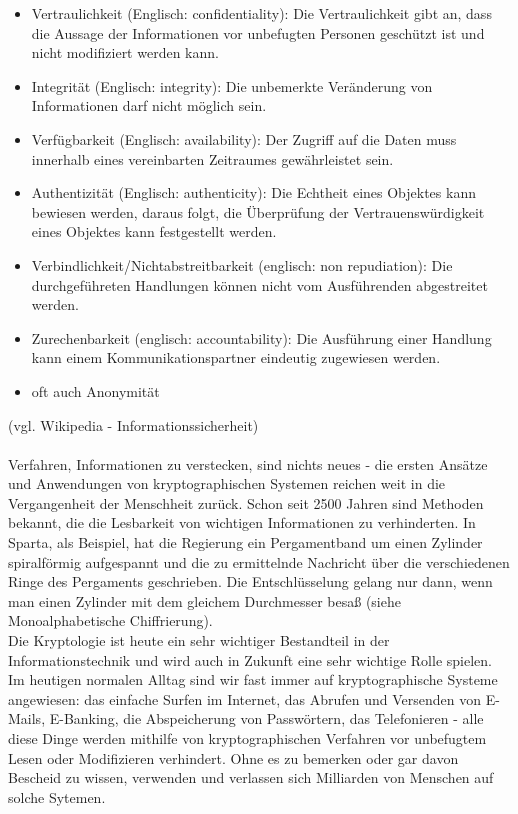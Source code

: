 \documentclass[12pt,a4paper]{report}
\begin{document}
\begin{itemize}
\item Vertraulichkeit (Englisch: confidentiality): Die Vertraulichkeit gibt an, dass die Aussage der Informationen vor unbefugten Personen geschützt ist und nicht modifiziert werden kann.
\item Integrität (Englisch: integrity): Die unbemerkte Veränderung von Informationen darf nicht möglich sein.
\item Verfügbarkeit (Englisch: availability): Der Zugriff auf die Daten muss innerhalb eines vereinbarten Zeitraumes gewährleistet sein.
\item Authentizität (Englisch: authenticity): Die Echtheit eines Objektes kann bewiesen werden, daraus folgt, die Überprüfung der Vertrauenswürdigkeit eines Objektes kann festgestellt werden.
\item Verbindlichkeit/Nichtabstreitbarkeit (englisch: non repudiation): Die durchgeführeten Handlungen können nicht vom Ausführenden abgestreitet werden.
\item Zurechenbarkeit (englisch: accountability): Die Ausführung einer Handlung kann einem Kommunikationspartner eindeutig zugewiesen werden.
\item oft auch Anonymität
\end{itemize}

(vgl. Wikipedia - Informationssicherheit)\\\\

Verfahren, Informationen zu verstecken, sind nichts neues - die ersten Ansätze und Anwendungen von kryptographischen Systemen reichen weit in die Vergangenheit der Menschheit zurück. Schon seit 2500 Jahren sind Methoden bekannt, die die Lesbarkeit von wichtigen Informationen zu verhinderten. In Sparta, als Beispiel, hat die Regierung ein Pergamentband um einen Zylinder spiralförmig aufgespannt und die zu ermittelnde Nachricht über die verschiedenen Ringe des Pergaments geschrieben. Die Entschlüsselung gelang nur dann, wenn man einen Zylinder mit dem gleichem Durchmesser besaß (siehe Monoalphabetische Chiffrierung).\\

Die Kryptologie ist heute ein sehr wichtiger Bestandteil in der Informationstechnik und wird auch in Zukunft eine sehr wichtige Rolle spielen. Im heutigen normalen Alltag sind wir fast immer auf kryptographische Systeme angewiesen: das einfache Surfen im Internet, das Abrufen und Versenden von E-Mails, E-Banking, die Abspeicherung von Passwörtern, das Telefonieren - alle diese Dinge werden mithilfe von kryptographischen Verfahren vor unbefugtem Lesen oder Modifizieren verhindert. Ohne es zu bemerken oder gar davon Bescheid zu wissen, verwenden und verlassen sich Milliarden von Menschen auf solche Sytemen.
\end{document}
